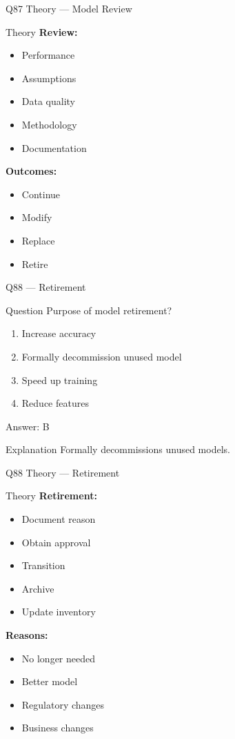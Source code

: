 \documentclass[aspectratio=169,8pt]{beamer}
\begin{document}
	\begin{frame}{Q87 Theory --- Model Review}
		\begin{block}{Theory}
			\textbf{Review:}
			\begin{itemize}
				\item Performance
				\item Assumptions
				\item Data quality
				\item Methodology
				\item Documentation
			\end{itemize}
			\textbf{Outcomes:}
			\begin{itemize}
				\item Continue
				\item Modify
				\item Replace
				\item Retire
			\end{itemize}
		\end{block}
	\end{frame}
	
	\begin{frame}{Q88 --- Retirement}
		\begin{block}{Question}
			Purpose of model retirement?
		\end{block}
		\begin{enumerate}[label=\Alph*.]
			\item Increase accuracy
			\item Formally decommission unused model
			\item Speed up training
			\item Reduce features
		\end{enumerate}
		\begin{exampleblock}{Answer: B}
		\end{exampleblock}
		\begin{block}{Explanation}
			Formally decommissions unused models.
		\end{block}
	\end{frame}
	
	\begin{frame}{Q88 Theory --- Retirement}
		\begin{block}{Theory}
			\textbf{Retirement:}
			\begin{itemize}
				\item Document reason
				\item Obtain approval
				\item Transition
				\item Archive
				\item Update inventory
			\end{itemize}
			\textbf{Reasons:}
			\begin{itemize}
				\item No longer needed
				\item Better model
				\item Regulatory changes
				\item Business changes
			\end{itemize}
		\end{block}
	\end{frame}
	
\end{document}

